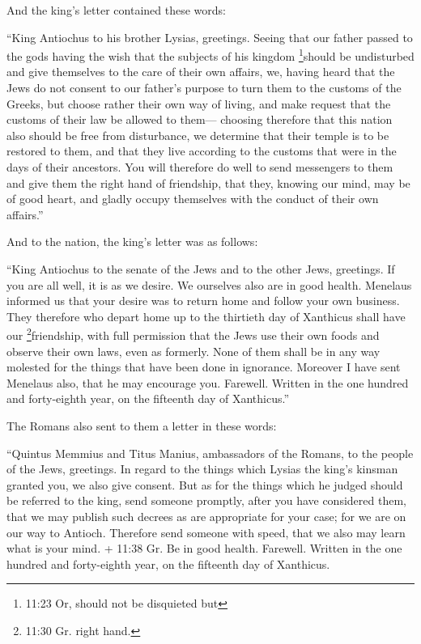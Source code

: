  And the king's letter contained these words:

``King Antiochus to his brother Lysias, greetings.  Seeing
that our father passed to the gods having the wish that the subjects of
his kingdom \footnote{11:23 Or, should not be disquieted but}should be
undisturbed and give themselves to the care of their own affairs,
 we, having heard that the Jews do not consent to our
father's purpose to turn them to the customs of the Greeks, but choose
rather their own way of living, and make request that the customs of
their law be allowed to them---  choosing therefore that
this nation also should be free from disturbance, we determine that
their temple is to be restored to them, and that they live according to
the customs that were in the days of their ancestors.  You
will therefore do well to send messengers to them and give them the
right hand of friendship, that they, knowing our mind, may be of good
heart, and gladly occupy themselves with the conduct of their own
affairs.''

 And to the nation, the king's letter was as follows:

``King Antiochus to the senate of the Jews and to the other Jews,
greetings.  If you are all well, it is as we desire. We
ourselves also are in good health.  Menelaus informed us
that your desire was to return home and follow your own business.
 They therefore who depart home up to the thirtieth day of
Xanthicus shall have our \footnote{11:30 Gr. right hand.}friendship,
with full permission  that the Jews use their own foods and
observe their own laws, even as formerly. None of them shall be in any
way molested for the things that have been done in ignorance.
 Moreover I have sent Menelaus also, that he may encourage
you.  Farewell. Written in the one hundred and forty-eighth
year, on the fifteenth day of Xanthicus.''

 The Romans also sent to them a letter in these words:

``Quintus Memmius and Titus Manius, ambassadors of the Romans, to the
people of the Jews, greetings.  In regard to the things
which Lysias the king's kinsman granted you, we also give consent.
 But as for the things which he judged should be referred
to the king, send someone promptly, after you have considered them, that
we may publish such decrees as are appropriate for your case; for we are
on our way to Antioch.  Therefore send someone with speed,
that we also may learn what is your mind.  + 11:38 Gr. Be
in good health. Farewell. Written in the one hundred and forty-eighth
year, on the fifteenth day of Xanthicus.

